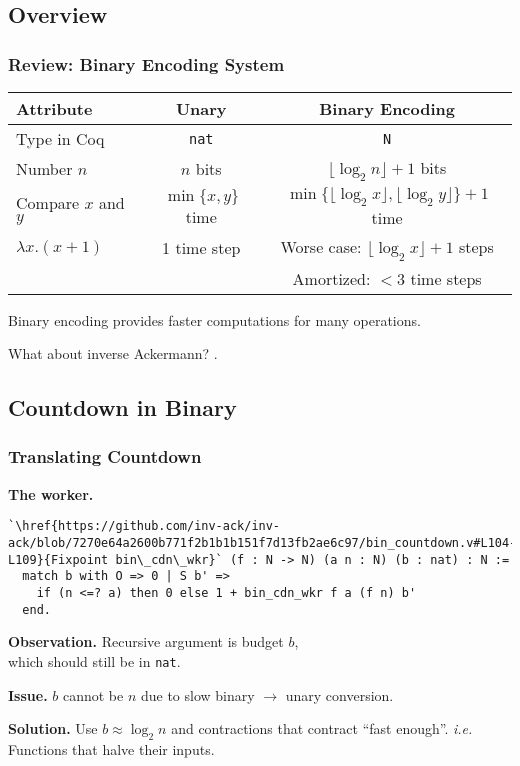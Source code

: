 
\subsection{Overview}

\begin{frame}
\frametitle{Review: Binary Encoding System}

\begin{tabular}{l|c|c}
	Attribute & Unary & Binary Encoding \\ \hline
	Type in Coq & \texttt{nat} & \texttt{N} \\[7pt]
	Number $n$ & $n$ bits & $\lfloor \log_2n \rfloor + 1$ bits \\[7pt]
	Compare $x$ and $y$ & $\min\{x, y\}$ time & $\min\{\lfloor \log_2x \rfloor, \lfloor \log_2y \rfloor\} + 1$ time \\[9pt]
	$\lambda x. (x + 1)$ & 1 time step & Worse case: $\lfloor \log_2x \rfloor + 1$ steps \\
	                     &             & Amortized: $< 3$ time steps \\
	                    
\end{tabular}

\bigskip

Binary encoding provides faster computations for many operations.

\smallskip

\pause 
What about inverse Ackermann? .

\end{frame}


\subsection{Countdown in Binary}


\begin{frame}[fragile]
\frametitle{Translating Countdown}

\textbf{The worker.}
\begin{lstlisting}
`\href{https://github.com/inv-ack/inv-ack/blob/7270e64a2600b771f2b1b1b151f7d13fb2ae6c97/bin_countdown.v#L104-L109}{Fixpoint bin\_cdn\_wkr}` (f : N -> N) (a n : N) (b : nat) : N :=
  match b with O => 0 | S b' =>
    if (n <=? a) then 0 else 1 + bin_cdn_wkr f a (f n) b'
  end.
\end{lstlisting}

\smallskip

\pause 
\textbf{Observation.} Recursive argument is budget $b$, \\which should still be in \texttt{nat}.

\bigskip

\textbf{Issue.} $b$ cannot be $n$ due to slow binary $\rightarrow$ unary conversion.

\bigskip

\pause 
\textbf{Solution.} Use $b \approx \log_2n$ and contractions that contract ``fast enough''. 
\emph{i.e.} Functions that halve their inputs.
\end{frame}



